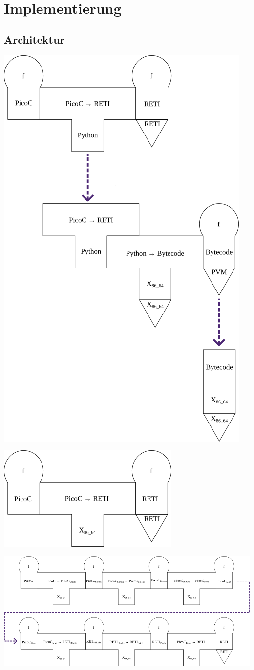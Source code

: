 
\chapter{Implementierung}
\label{ch:implementierung}
\section{Architektur}

{
  \centering
  \includegraphics[width=0.5\linewidth]{./figures/summarized_cross_compiler.png}
}

{
  \centering
  \includegraphics[width=0.33\linewidth]{./figures/compiliervorang_mit_machiene.png}
}

{
  \centering
  \includegraphics[width=\linewidth]{./figures/passes.png}
}

